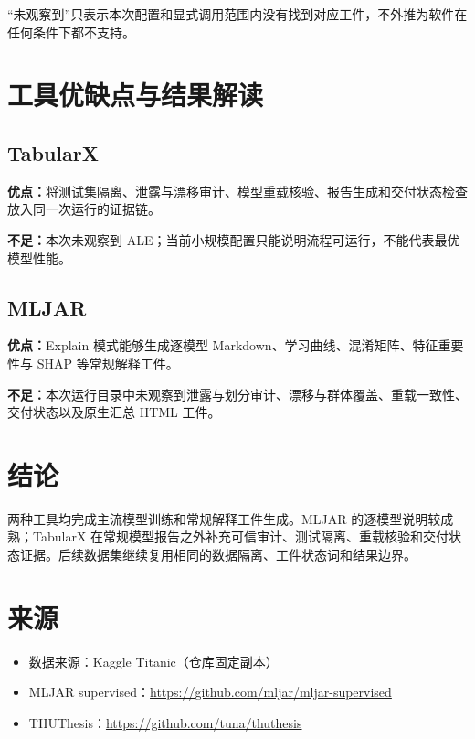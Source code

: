\documentclass[degree=bachelor,language=chinese,fontset=fandol]{thuthesis}
\begin{document}
“未观察到”只表示本次配置和显式调用范围内没有找到对应工件，不外推为软件在任何条件下都不支持。

\chapter{工具优缺点与结果解读}
\section{TabularX}
\textbf{优点：}将测试集隔离、泄露与漂移审计、模型重载核验、报告生成和交付状态检查放入同一次运行的证据链。

\textbf{不足：}本次未观察到 ALE；当前小规模配置只能说明流程可运行，不能代表最优模型性能。

\section{MLJAR}
\textbf{优点：}Explain 模式能够生成逐模型 Markdown、学习曲线、混淆矩阵、特征重要性与 SHAP 等常规解释工件。

\textbf{不足：}本次运行目录中未观察到泄露与划分审计、漂移与群体覆盖、重载一致性、交付状态以及原生汇总 HTML 工件。

\chapter{结论}
两种工具均完成主流模型训练和常规解释工件生成。MLJAR 的逐模型说明较成熟；TabularX 在常规模型报告之外补充可信审计、测试隔离、重载核验和交付状态证据。后续数据集继续复用相同的数据隔离、工件状态词和结果边界。

\backmatter
\chapter{来源}
\begin{itemize}
  \item 数据来源：Kaggle Titanic（仓库固定副本）
  \item MLJAR supervised：\url{https://github.com/mljar/mljar-supervised}
  \item THUThesis：\url{https://github.com/tuna/thuthesis}
\end{itemize}
\end{document}
